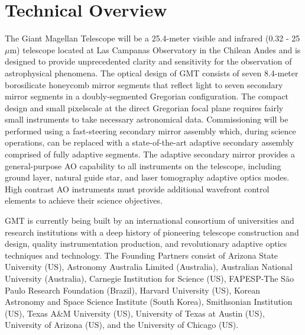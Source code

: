 \documentclass[12pt,preprint]{aastex}
\begin{document}
\section{Technical Overview}

The Giant Magellan Telescope will be a 25.4-meter visible and infrared (0.32 - 25 $\mu$m) telescope located at Las Campanas Observatory in the Chilean Andes and is designed to provide unprecedented clarity and sensitivity for the observation of astrophysical phenomena. The optical design of GMT consists of seven 8.4-meter borosilicate honeycomb mirror segments that reflect light to seven secondary mirror segments in a doubly-segmented Gregorian configuration. The compact design and small pixelscale at the direct Gregorian focal plane requires fairly small instruments to take necessary astronomical data. Commissioning will be performed using a fast-steering secondary mirror assembly which, during science operations, can be replaced with a state-of-the-art adaptive secondary assembly comprised of fully adaptive segments. The adaptive secondary mirror provides a general-purpose AO capability to all instruments on the telescope, including ground layer, natural guide star, and laser tomography adaptive optics modes. High contrast AO instruments must provide additional wavefront control elements to achieve their science objectives.

GMT is currently being built by an international consortium of universities and research institutions with a deep history of pioneering telescope construction and design, quality instrumentation production, and revolutionary adaptive optics techniques and technology. The Founding Partners consist of Arizona State University (US), Astronomy Australia Limited (Australia), Australian National University (Australia), Carnegie Institution for Science (US), FAPESP-The S\~ao Paulo Research Foundation (Brazil), Harvard University (US), Korean Astronomy and Space Science Institute (South Korea), Smithsonian Institution (US), Texas A\&M University (US), University of Texas at Austin (US), University of Arizona (US), and the University of Chicago (US).
\end{document}
